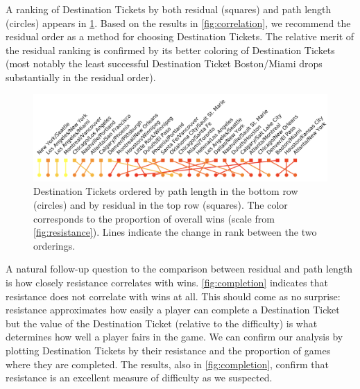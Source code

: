 A ranking of Destination Tickets by both residual (squares)
and path length (circles) appears in \cref{fig:rankings}.
Based on the results in \cref{fig:correlation},
we recommend the residual order as a method for choosing
Destination Tickets.
The relative merit of the residual ranking is confirmed
by its better coloring of Destination Tickets
(most notably the least successful Destination Ticket
Boston/Miami drops substantially in the residual order).

\begin{figure}[H]
    \centering
    \includegraphics[scale=.25]{figures/rankings2.png}
    \caption{Destination Tickets ordered by path length
    in the bottom row (circles) and by residual
    in the top row (squares). The color
    corresponds to the proportion of overall wins (scale
    from \cref{fig:resistance}).
    Lines indicate the change in rank between
    the two orderings.}
    \label{fig:rankings}
\end{figure}

A natural follow-up question to the comparison
between residual and path length is how closely
resistance correlates with wins.
\cref{fig:completion} indicates that
resistance does not correlate with wins at all.
This should come as no surprise: resistance approximates
how easily a player can complete a Destination Ticket
but the value of the Destination Ticket (relative
to the difficulty) is what determines how well
a player fairs in the game.
We can confirm our analysis by plotting Destination
Tickets by their resistance and the proportion
of games where they are completed.
The results, also in \cref{fig:completion}, confirm
that resistance is an excellent measure of difficulty
as we suspected.

